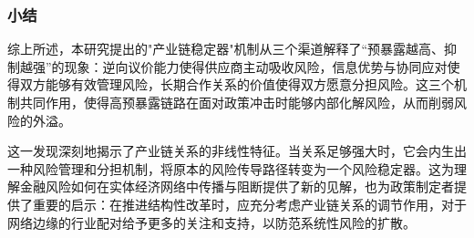\subsubsection*{小结}

综上所述，本研究提出的"产业链稳定器"机制从三个渠道解释了“预暴露越高、抑制越强”的现象：逆向议价能力使得供应商主动吸收风险，信息优势与协同应对使得双方能够有效管理风险，长期合作关系的价值使得双方愿意分担风险。这三个机制共同作用，使得高预暴露链路在面对政策冲击时能够内部化解风险，从而削弱风险的外溢。

这一发现深刻地揭示了产业链关系的非线性特征。当关系足够强大时，它会内生出一种风险管理和分担机制，将原本的风险传导路径转变为一个风险稳定器。这为理解金融风险如何在实体经济网络中传播与阻断提供了新的见解，也为政策制定者提供了重要的启示：在推进结构性改革时，应充分考虑产业链关系的调节作用，对于网络边缘的行业配对给予更多的关注和支持，以防范系统性风险的扩散。


